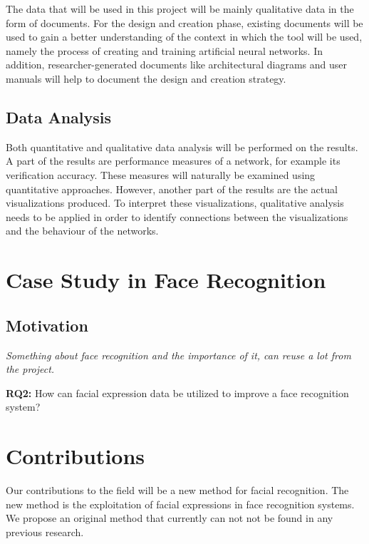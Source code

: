 The data that will be used in this project will be mainly qualitative data in the form of documents. For the design and creation phase, existing documents will be used to gain a better understanding of the context in which the tool will be used, namely the process of creating and training artificial neural networks. In addition, researcher-generated documents like architectural diagrams and user manuals will help to document the design and creation strategy.

\subsection{Data Analysis}

Both quantitative and qualitative data analysis will be performed on the results. A part of the results are performance measures of a network, for example its verification accuracy. These measures will naturally be examined using quantitative approaches. However, another part of the results are the actual visualizations produced. To interpret these visualizations, qualitative analysis needs to be applied in order to identify connections between the visualizations and the behaviour of the networks.

\section{Case Study in Face Recognition}

\subsection{Motivation}

\textit{Something about face recognition and the importance of it, can reuse a lot from the project.}

\noindent\textbf{RQ2:} How can facial expression data be utilized to improve a face recognition system? \\

\section{Contributions}

\noindent Our contributions to the field will be a new method for facial recognition. The new method is the exploitation of facial expressions in face recognition systems. We propose an original method that currently can not not be found in any previous research.

